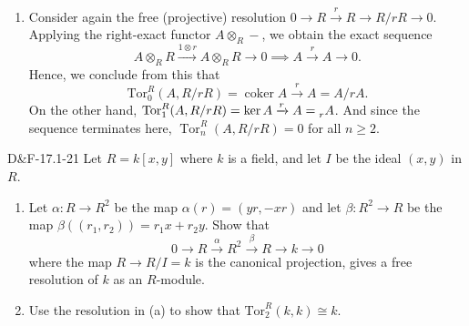 \documentclass{article}
\newcommand{\tor}{\text{Tor}}
\begin{document}
\begin{enumerate}[itemsep =-2pt,label= \textbf{(\alph{*})}]
\begin{equation*}
		\end{equation*} 
		Since $\operatorname{Hom}_{R}(R, B) \cong B$ (by means of the identification $f \mapsto f(1)$), $\ker{r^{\ast}} = rB$. Hence, 
		\begin{equation*}
			\operatorname{Ext}_{R}^{1}(R/rR, B) \cong \frac{\ker{0}}{\operatorname{image}{r}} = B/rB. 
		\end{equation*}
		Since the sequence only has two nonzero components, it follows that $\operatorname{Ext}_{R}^{n}(R/rR, B) = 0$ for all $n\geq 2$. 
		\item Consider again the free (projective) resolution $0 \to R \xrightarrow{r} R \to R/rR \to 0$. Applying the right-exact functor $A \otimes_{R} -$, we obtain the exact sequence 
		\begin{equation*}
			A \otimes_{R}R \xrightarrow{1 \otimes r} A \otimes_{R}R \to 0 \implies A \xrightarrow{r} A \to 0.  
		\end{equation*}
		Hence, we conclude from this that 
		\begin{equation*}
			\tor_{0}^{R}(A, R/rR) = \operatorname{coker}{A \xrightarrow{r} A} = A/rA. 
		\end{equation*}
		On the other hand, $\tor_{1}^{R}(A, R/rR) = \ker{A \xrightarrow{r} A} = \prescript{}{r}{A}$. And since the sequence terminates here, $\operatorname{Tor}_{n}^{R}(A, R/rR) = 0$ for all $n\geq 2$. 
	\end{enumerate}
	
	\begin{prb}{D\&F-17.1-21}
		Let $R = k[x,y]$ where $k$ is a field, and let $I$ be the ideal $(x,y)$ in $R$. \vspace{-0.25cm}
		\begin{enumerate}[itemsep =-2pt,label= \textbf{(\alph{*})}]
			\item Let $\alpha: R \to R^{2}$ be the map $\alpha(r) = (yr, -xr)$ and let $\beta: R^{2} \to R$ be the map $\beta((r_{1}, r_{2})) = r_{1}x + r_{2}y$. Show that 
			\begin{equation*}
				0 \to R \xrightarrow{\alpha} R^{2} \xrightarrow{\beta} R \to k \to 0
			\end{equation*}
			where the map $R \to R/I = k$ is the canonical projection, gives a free resolution of $k$ as an $R$-module. 
			\item Use the resolution in (a) to show that $\tor_{2}^{R}(k, k) \cong k$. 
		\end{enumerate}
	\end{prb}
	
\end{document}
